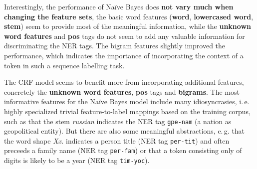 \documentclass[twocolumns]{IEEEtran}
\begin{document}
Interestingly, the performance of Na\"ive Bayes does \textbf{not vary much when changing the feature sets}, the basic word features (\textbf{word}, \textbf{lowercased word}, \textbf{stem}) seem to provide most of the meaningful information, while the \textbf{unknown word features} and \textbf{pos} tags do not seem to add any valuable information for discriminating the NER tags. The bigram features slightly improved the performance, which indicates the importance of incorporating the context of a token in such a sequence labelling task.

The CRF model seems to benefit more from incorporating additional features, concretely the \textbf{unknown word features}, \textbf{pos} tags and \textbf{bigrams}. %
The most informative features for the Na\"ive Bayes model include many idiosyncrasies, i.\,e. highly specialized trivial feature-to-label mappings based on the training corpus, such as that the stem \textit{russian} indicates the NER tag \texttt{gpe-nam} (a nation as geopolitical entity). But there are also some meaningful abstractions, e.\,g. that the word shape \textit{Xx.} indicates a person title (NER tag \texttt{per-tit}) and often preceeds a family name (NER tag \texttt{per-fam}) or that a token consisting only of digits is likely to be a year (NER tag \texttt{tim-yoc}).

\begin{table}[h]
    \centering
    \caption{NER Performance Evaluation of HMM}\label{nerhmm}
\end{table}

\begin{table}[h]
    \centering
    \caption{NER Performance Evaluation of CRF}\label{nercrf}
\end{table}
\end{document}
